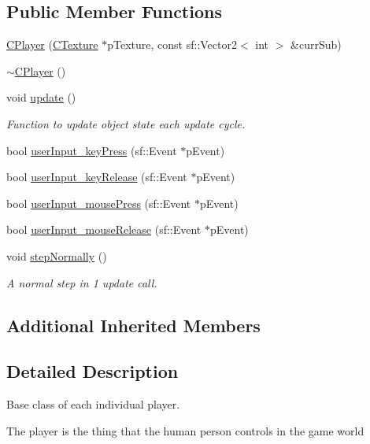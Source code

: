 \subsection*{Public Member Functions}
\begin{DoxyCompactItemize}
\item 
\hyperlink{classCPlayer_a983c63a3e18585a94f66f0bd23c57cd3}{C\-Player} (\hyperlink{classCTexture}{C\-Texture} $\ast$p\-Texture, const sf\-::\-Vector2$<$ int $>$ \&curr\-Sub)
\item 
\hyperlink{classCPlayer_ad02df04887bccfe3b82298895da24af6}{$\sim$\-C\-Player} ()
\item 
void \hyperlink{classCPlayer_aa77025c046956b109a76d53c12a80fa5}{update} ()
\begin{DoxyCompactList}\small\item\em Function to update object state each update cycle. \end{DoxyCompactList}\item 
bool \hyperlink{classCPlayer_ab91fc8d3c4e992dd20270d5743d75f06}{user\-Input\-\_\-key\-Press} (sf\-::\-Event $\ast$p\-Event)
\item 
bool \hyperlink{classCPlayer_a8ef81a467d70f1e4529f3c905820311b}{user\-Input\-\_\-key\-Release} (sf\-::\-Event $\ast$p\-Event)
\item 
bool \hyperlink{classCPlayer_ab73ca18309b25410b1fdb54a9ee60e67}{user\-Input\-\_\-mouse\-Press} (sf\-::\-Event $\ast$p\-Event)
\item 
bool \hyperlink{classCPlayer_a915cf5ad902cddb376eb4c37d362e3b1}{user\-Input\-\_\-mouse\-Release} (sf\-::\-Event $\ast$p\-Event)
\item 
void \hyperlink{classCPlayer_aedadef185076d940923e9402a15cdf90}{step\-Normally} ()
\begin{DoxyCompactList}\small\item\em A normal step in 1 update call. \end{DoxyCompactList}\end{DoxyCompactItemize}
\subsection*{Additional Inherited Members}


\subsection{Detailed Description}
Base class of each individual player. 

The player is the thing that the human person controls in the game world 

